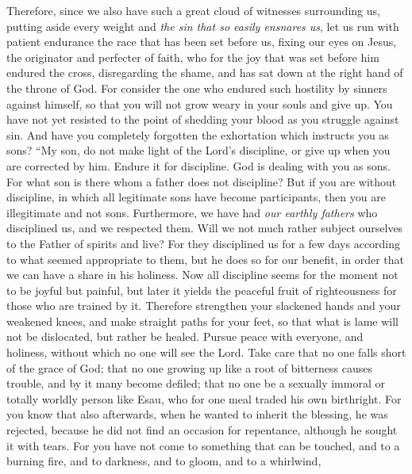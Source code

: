 \begin{biblechapter} %
 Therefore, since we also have such a great cloud of witnesses surrounding us, putting aside every weight and \textit{the sin that so easily ensnares us}, let us run with patient endurance the race that has been set before us,
\verse fixing our eyes on Jesus, the originator and perfecter of faith, who for the joy that was set before him endured the cross, disregarding the shame, and has sat down at the right hand of the throne of God.
\verse For consider the one who endured such hostility by sinners against himself, so that you will not grow weary in your souls and give up.
\verse You have not yet resisted to the point of shedding your blood as you struggle against sin.
\verse And have you completely forgotten the exhortation which instructs you as sons?
\verse “My son, do not make light of the Lord’s discipline, 
or give up when you are corrected by him.
\verse Endure it for discipline. God is dealing with you as sons. For what son is there whom a father does not discipline?
\verse But if you are without discipline, in which all legitimate sons have become participants, then you are illegitimate and not sons.
\verse Furthermore, we have had \textit{our earthly fathers} who disciplined us, and we respected them. Will we not much rather subject ourselves to the Father of spirits and live?
\verse For they disciplined us for a few days according to what seemed appropriate to them, but he does so for our benefit, in order that we can have a share in his holiness.
\verse Now all discipline seems for the moment not to be joyful but painful, but later it yields the peaceful fruit of righteousness for those who are trained by it.
 Therefore strengthen your slackened hands and your weakened knees,
\verse and make straight paths for your feet, so that what is lame will not be dislocated, but rather be healed.
\verse Pursue peace with everyone, and holiness, without which no one will see the Lord.
\verse Take care that no one falls short of the grace of God; that no one growing up like a root of bitterness causes trouble, and by it many become defiled;
\verse that no one be a sexually immoral or totally worldly person like Esau, who for one meal traded his own birthright.
\verse For you know that also afterwards, when he wanted to inherit the blessing, he was rejected, because he did not find an occasion for repentance, although he sought it with tears.
\verse For you have not come to something that can be touched, and to a burning fire, and to darkness, and to gloom, and to a whirlwind,

\end{biblechapter}
